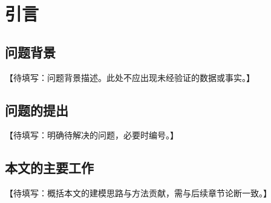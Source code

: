 \section{引言}\label{sec:intro}


\subsection{问题背景}\label{subsec:intro_background}

【待填写：问题背景描述。此处不应出现未经验证的数据或事实。】

\subsection{问题的提出}\label{subsec:intro_problem}

【待填写：明确待解决的问题，必要时编号。】

\subsection{本文的主要工作}\label{subsec:intro_contributions}

【待填写：概括本文的建模思路与方法贡献，需与后续章节论断一致。】

